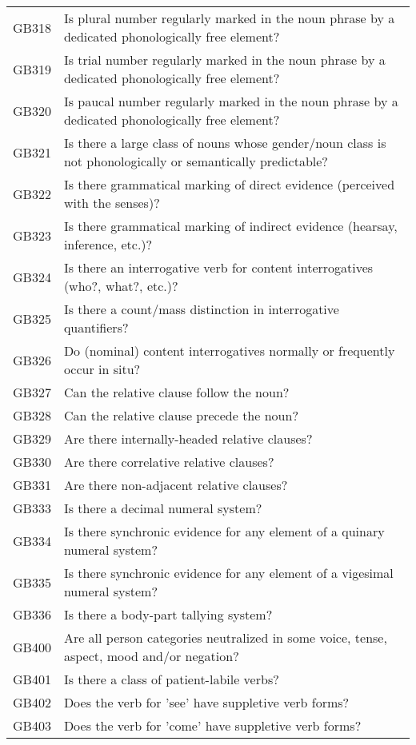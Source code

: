\begin{longtable}{p{3cm}p{12cm}}
  GB318 & Is plural number regularly marked in the noun phrase by a dedicated phonologically free element? \\ 
  GB319 & Is trial number regularly marked in the noun phrase by a dedicated phonologically free element? \\ 
  GB320 & Is paucal number regularly marked in the noun phrase by a dedicated phonologically free element? \\ 
  GB321 & Is there a large class of nouns whose gender/noun class is not phonologically or semantically predictable? \\ 
  GB322 & Is there grammatical marking of direct evidence (perceived with the senses)? \\ 
  GB323 & Is there grammatical marking of indirect evidence (hearsay, inference, etc.)? \\ 
  GB324 & Is there an interrogative verb for content interrogatives (who?, what?, etc.)? \\ 
  GB325 & Is there a count/mass distinction in interrogative quantifiers? \\ 
  GB326 & Do (nominal) content interrogatives normally or frequently occur in situ? \\ 
  GB327 & Can the relative clause follow the noun? \\ 
  GB328 & Can the relative clause precede the noun? \\ 
  GB329 & Are there internally-headed relative clauses? \\ 
  GB330 & Are there correlative relative clauses? \\ 
  GB331 & Are there non-adjacent relative clauses? \\ 
  GB333 & Is there a decimal numeral system? \\ 
  GB334 & Is there synchronic evidence for any element of a quinary numeral system? \\ 
  GB335 & Is there synchronic evidence for any element of a vigesimal numeral system? \\ 
  GB336 & Is there a body-part tallying system? \\ 
  GB400 & Are all person categories neutralized in some voice, tense, aspect, mood and/or negation? \\ 
  GB401 & Is there a class of patient-labile verbs? \\ 
  GB402 & Does the verb for 'see' have suppletive verb forms? \\ 
  GB403 & Does the verb for 'come' have suppletive verb forms? \\ 

\end{longtable}

